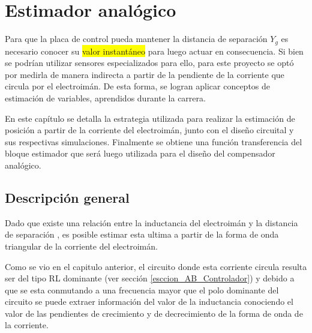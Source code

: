 \chapter{Estimador analógico}  \label{cap:Estimador Analogico}


 Para que la placa de control pueda mantener la distancia de separación $Y_{g}$ es necesario conocer su \colorbox{yellow}{valor instantáneo} para luego actuar en consecuencia. Si bien se podrían utilizar sensores  especializados para ello, para este proyecto se optó por medirla de manera indirecta a partir de la pendiente de la corriente que circula por el electroimán. De esta forma, se logran aplicar conceptos de estimación de variables, aprendidos durante la carrera. 
 
 En este capítulo se detalla la estrategia utilizada para realizar la estimación de posición a partir de la corriente del electroimán, junto con el diseño circuital y sus respectivas simulaciones. Finalmente se obtiene una función transferencia del bloque estimador que será luego utilizada para el diseño del compensador analógico.

\section{Descripción general}


Dado que existe una relación entre la inductancia del electroimán y la distancia de separación , es posible estimar esta ultima a partir de la forma de onda triangular de la corriente del electroimán. 

Como se vio en el capitulo anterior, el circuito donde esta corriente circula resulta ser del tipo RL dominante (ver sección \ref{esccion_AB_Controlador}) y debido a que se esta conmutando a una frecuencia mayor que el polo dominante del circuito se puede extraer información del valor de la inductancia conociendo el valor de las pendientes de crecimiento y de decrecimiento de la forma de onda de la corriente.

